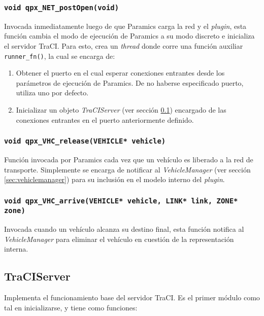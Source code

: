 \subsubsection{\texttt{void qpx\_NET\_postOpen(void)}}\label{sec:qpx_postopen}

Invocada inmediatamente luego de que Paramics carga la red y el \emph{plugin}, esta función cambia el modo de ejecución de Paramics a su modo discreto e inicializa el servidor TraCI. Para esto, crea un \emph{thread} donde corre una función auxiliar \texttt{runner\_fn()}, la cual se encarga de:

\begin{enumerate}
    \item Obtener el puerto en el cual esperar conexiones entrantes desde los parámetros de ejecución de Paramics. De no haberse especificado puerto, utiliza uno por defecto.
    \item Inicializar un objeto \emph{TraCIServer} (ver sección \ref{sec:traciserver}) encargado de las conexiones entrantes en el puerto anteriormente definido.
\end{enumerate}

\subsubsection{\texttt{void qpx\_VHC\_release(VEHICLE* vehicle)}}

Función invocada por Paramics cada vez que un vehículo es liberado a la red de transporte. Simplemente se encarga de notificar al \emph{VehicleManager} (ver sección \ref{sec:vehiclemanager}) para su inclusión en el modelo interno del \emph{plugin}.

\subsubsection{\texttt{void qpx\_VHC\_arrive(VEHICLE* vehicle, LINK* link, ZONE* zone)}}

Invocada cuando un vehículo alcanza su destino final, esta función notifica al \emph{VehicleManager} para eliminar el vehículo en cuestión de la representación interna.

\subsection{TraCIServer}\label{sec:traciserver}

Implementa el funcionamiento base del servidor TraCI. Es el primer módulo como tal en inicializarse, y tiene como funciones:


